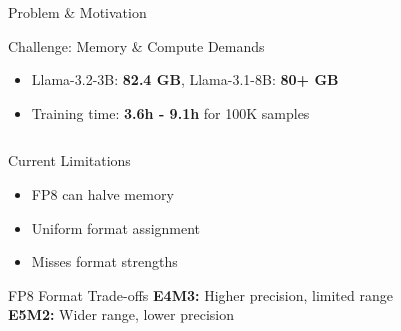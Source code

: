 \begin{frame}[squeeze]{Problem \& Motivation}

\begin{block}{Challenge: Memory \& Compute Demands}
\small
\begin{itemize}
    \item Llama-3.2-3B: \textbf{82.4 GB}, Llama-3.1-8B: \textbf{80+ GB}
    \item Training time: \textbf{3.6h - 9.1h} for 100K samples
\end{itemize}
\end{block}

\vspace{0.1cm}

\begin{columns}[c]
\begin{column}{0.55\textwidth}
    \begin{block}{Current Limitations}
    \small
    \begin{itemize}
        \item FP8 can halve memory
        \item Uniform format assignment
        \item Misses format strengths
    \end{itemize}
    \end{block}

    \vspace{0.1cm}

    \begin{alertblock}{FP8 Format Trade-offs}
    \small
    \textbf{E4M3:} Higher precision, limited range\\
    \textbf{E5M2:} Wider range, lower precision
    \end{alertblock}
\end{column}


\end{columns}
\end{frame}
